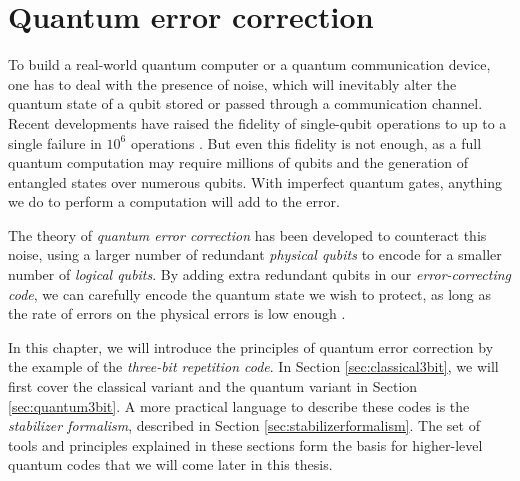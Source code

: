 \chapter{Quantum error correction}\label{ch:qec}

To build a real-world quantum computer or a quantum communication device, one has to deal with the presence of noise, which will inevitably alter the quantum state of a qubit stored or passed through a communication channel. Recent developments have raised the fidelity of single-qubit operations to up to a single failure in $10^6$ operations \cite{ballance2016high}. But even this fidelity is not enough, as a full quantum computation may require millions of qubits and the generation of entangled states over numerous qubits. With imperfect quantum gates, anything we do to perform a computation will add to the error. 

The theory of \emph{quantum error correction} has been developed to counteract this noise, using a larger number of redundant \emph{physical qubits} to encode for a smaller number of \emph{logical qubits}. By adding extra redundant qubits in our \emph{error-correcting code}, we can carefully encode the quantum state we wish to protect, as long as the rate of errors on the physical errors is low enough \cite{calderbank1996good, steane1996multiple, preskill1998reliable}.

In this chapter, we will introduce the principles of quantum error correction by the example of the \emph{three-bit repetition code}. In Section \ref{sec:classical3bit}, we will first cover the classical variant and the quantum variant in Section \ref{sec:quantum3bit}. A more practical language to describe these codes is the \emph{stabilizer formalism}, described in Section \ref{sec:stabilizerformalism}. The set of tools and principles explained in these sections form the basis for higher-level quantum codes that we will come later in this thesis.

